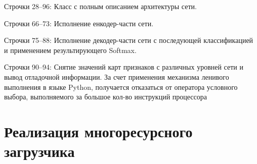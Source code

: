 Строчки 28--96: Класс с полным описанием архитектуры сети.

Строчки 66--73: Исполнение енкодер-части сети.

Строчки 75--88: Исполнение декодер-части сети с последующей классификацией и применением результирующего Softmax.

Строчки 90--94: Снятие значений карт признаков с различных уровней сети и вывод отладочной информации.
За счет применения механизма ленивого выполнения в языке Python,
получается отказаться от оператора условного выбора, выполняемого за большое кол-во инструкций процессора

\section{Реализация многоресурсного загрузчика}

